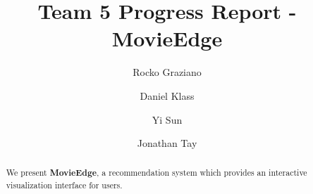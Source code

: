 \documentclass[sigchi, 12pt, nonacm=true, timestamp=true, screen=true]{acmart}
\begin{document}
\title{Team 5 Progress Report - MovieEdge}


\author{Rocko Graziano}
\author{Daniel Klass}
\author{Yi Sun}
\author{Jonathan Tay}



\begin{abstract}
	We present \textbf{MovieEdge}, a recommendation system which provides an interactive visualization interface for users.
\end{abstract}
\end{document}
